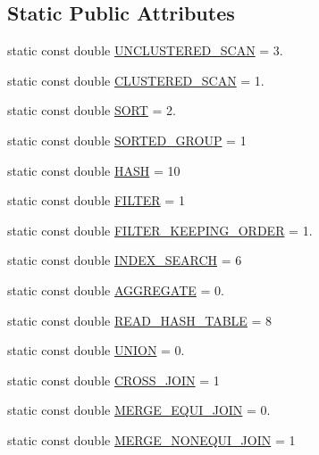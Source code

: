 \subsection*{Static Public Attributes}
\begin{DoxyCompactItemize}
\item 
static const double \hyperlink{class_time_complexity_a271a2e8ae589bd80b438ab11908cad02}{U\+N\+C\+L\+U\+S\+T\+E\+R\+E\+D\+\_\+\+S\+C\+A\+N} = 3.
\item 
static const double \hyperlink{class_time_complexity_a5d917c41e7784cc85a29650ea9e54db2}{C\+L\+U\+S\+T\+E\+R\+E\+D\+\_\+\+S\+C\+A\+N} = 1.
\item 
static const double \hyperlink{class_time_complexity_ab8e878b2dcc5d2943614849a27e4edbb}{S\+O\+R\+T} = 2.
\item 
static const double \hyperlink{class_time_complexity_ad2ed168a66bfcbd9f5831360e4d6437a}{S\+O\+R\+T\+E\+D\+\_\+\+G\+R\+O\+U\+P} = 1
\item 
static const double \hyperlink{class_time_complexity_a052631ae60c26ad4f0d840f012193898}{H\+A\+S\+H} = 10
\item 
static const double \hyperlink{class_time_complexity_a4a30ee8b7f0778df1564a9c0baa259bd}{F\+I\+L\+T\+E\+R} = 1
\item 
static const double \hyperlink{class_time_complexity_a31c8e9e4ede24384d6dfc199d7dd1df6}{F\+I\+L\+T\+E\+R\+\_\+\+K\+E\+E\+P\+I\+N\+G\+\_\+\+O\+R\+D\+E\+R} = 1.
\item 
static const double \hyperlink{class_time_complexity_ae8697720bb5788db90670f511073a606}{I\+N\+D\+E\+X\+\_\+\+S\+E\+A\+R\+C\+H} = 6
\item 
static const double \hyperlink{class_time_complexity_a9bb16133f1284faf24bd901d8947b896}{A\+G\+G\+R\+E\+G\+A\+T\+E} = 0.
\item 
static const double \hyperlink{class_time_complexity_a7b47ef70ce9096d049a233c819c850de}{R\+E\+A\+D\+\_\+\+H\+A\+S\+H\+\_\+\+T\+A\+B\+L\+E} = 8
\item 
static const double \hyperlink{class_time_complexity_a91493cbef5029bd9aa68e0106c603f6a}{U\+N\+I\+O\+N} = 0.
\item 
static const double \hyperlink{class_time_complexity_afe17c2e0735b25c3fe8df95d00affc91}{C\+R\+O\+S\+S\+\_\+\+J\+O\+I\+N} = 1
\item 
static const double \hyperlink{class_time_complexity_a6d5c9703d95ebce5c94a159991de53b5}{M\+E\+R\+G\+E\+\_\+\+E\+Q\+U\+I\+\_\+\+J\+O\+I\+N} = 0.
\item 
static const double \hyperlink{class_time_complexity_a5c7a2b2c29677f090bae490f57d486fa}{M\+E\+R\+G\+E\+\_\+\+N\+O\+N\+E\+Q\+U\+I\+\_\+\+J\+O\+I\+N} = 1
\end{DoxyCompactItemize}


